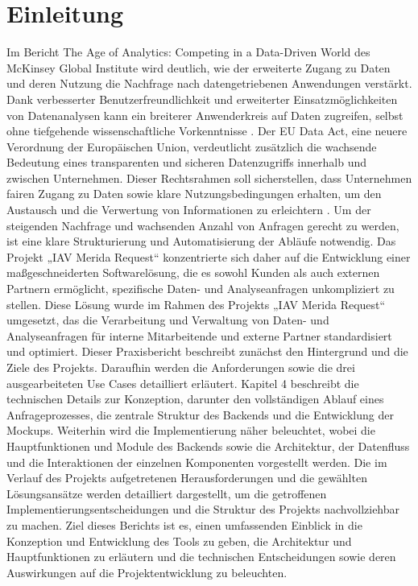\chapter{Einleitung}
\label{chap:einleitung}
Im Bericht \glqq The Age of Analytics: Competing in a Data-Driven World\grqq{} des McKinsey Global Institute wird deutlich, wie der erweiterte Zugang zu Daten und deren Nutzung die Nachfrage nach datengetriebenen Anwendungen verstärkt. Dank verbesserter Benutzerfreundlichkeit und erweiterter Einsatzmöglichkeiten von Datenanalysen kann ein breiterer Anwenderkreis auf Daten zugreifen, selbst ohne tiefgehende wissenschaftliche Vorkenntnisse \cite{mckinsey2016analytics}.
\newline
Der EU Data Act, eine neuere Verordnung der Europäischen Union, verdeutlicht zusätzlich die wachsende Bedeutung eines transparenten und sicheren Datenzugriffs innerhalb und zwischen Unternehmen. Dieser Rechtsrahmen soll sicherstellen, dass Unternehmen fairen Zugang zu Daten sowie klare Nutzungsbedingungen erhalten, um den Austausch und die Verwertung von Informationen zu erleichtern \cite{EUData_JohnerInstitut}.
\newline
\newline
Um der steigenden Nachfrage und wachsenden Anzahl von Anfragen gerecht zu werden, ist eine klare Strukturierung und Automatisierung der Abläufe notwendig. Das Projekt „IAV Merida Request“ konzentrierte sich daher auf die Entwicklung einer maßgeschneiderten Softwarelösung, die es sowohl Kunden als auch externen Partnern ermöglicht, spezifische Daten- und Analyseanfragen unkompliziert zu stellen. Diese Lösung wurde im Rahmen des Projekts „IAV Merida Request“ umgesetzt, das die Verarbeitung und Verwaltung von Daten- und Analyseanfragen für interne Mitarbeitende und externe Partner standardisiert und optimiert.
\newline
Dieser Praxisbericht beschreibt zunächst den Hintergrund und die Ziele des Projekts. Daraufhin werden die Anforderungen sowie die drei ausgearbeiteten Use Cases detailliert erläutert. Kapitel 4 beschreibt die technischen Details zur Konzeption, darunter den vollständigen Ablauf eines Anfrageprozesses, die zentrale Struktur des Backends und die Entwicklung der Mockups. Weiterhin wird die Implementierung näher beleuchtet, wobei die Hauptfunktionen und Module des Backends sowie die Architektur, der Datenfluss und die Interaktionen der einzelnen Komponenten vorgestellt werden. Die im Verlauf des Projekts aufgetretenen Herausforderungen und die gewählten Lösungsansätze werden detailliert dargestellt, um die getroffenen Implementierungsentscheidungen und die Struktur des Projekts nachvollziehbar zu machen.
\newline
\newline
Ziel dieses Berichts ist es, einen umfassenden Einblick in die Konzeption und Entwicklung des Tools zu geben, die Architektur und Hauptfunktionen zu erläutern und die technischen Entscheidungen sowie deren Auswirkungen auf die Projektentwicklung zu beleuchten.






